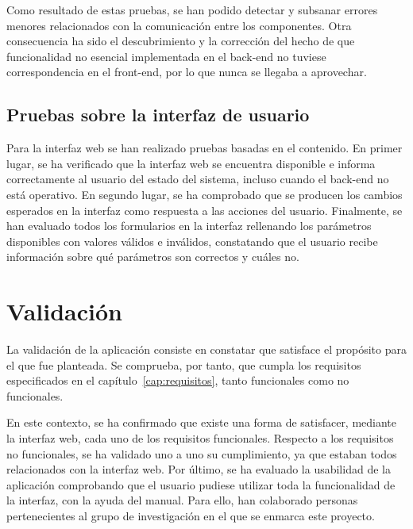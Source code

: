 Como resultado de estas pruebas, se han podido detectar y subsanar errores menores relacionados con la comunicación entre los componentes.
Otra consecuencia ha sido el descubrimiento y la corrección del hecho de que funcionalidad no esencial implementada en el \gls{back-end} no tuviese correspondencia en el \gls{front-end}, por lo que nunca se llegaba a aprovechar.

\subsection*{Pruebas sobre la interfaz de usuario\label{ssec:pb:interfaz}}

Para la interfaz web se han realizado pruebas basadas en el contenido.
En primer lugar, se ha verificado que la interfaz web se encuentra disponible e informa correctamente al usuario del estado del sistema, incluso cuando el \gls{back-end} no está operativo.
En segundo lugar, se ha comprobado que se producen los cambios esperados en la interfaz como respuesta a las acciones del usuario.
Finalmente, se han evaluado todos los formularios en la interfaz rellenando los parámetros disponibles con valores válidos e inválidos, constatando que el usuario recibe información sobre qué parámetros son correctos y cuáles no.

\section{Validación\label{sec:pb:validacion}}

La validación de la aplicación consiste en constatar que satisface el propósito para el que fue planteada.
Se comprueba, por tanto, que cumpla los requisitos especificados en el capítulo~\ref{cap:requisitos}, tanto funcionales como no funcionales.

En este contexto, se ha confirmado que existe una forma de satisfacer, mediante la interfaz web, cada uno de los requisitos funcionales.
Respecto a los requisitos no funcionales, se ha validado uno a uno su cumplimiento, ya que estaban todos relacionados con la interfaz web.
Por último, se ha evaluado la usabilidad de la aplicación comprobando que el usuario pudiese utilizar toda la funcionalidad de la interfaz, con la ayuda del manual.
Para ello, han colaborado personas pertenecientes al grupo de investigación en el que se enmarca este proyecto.

